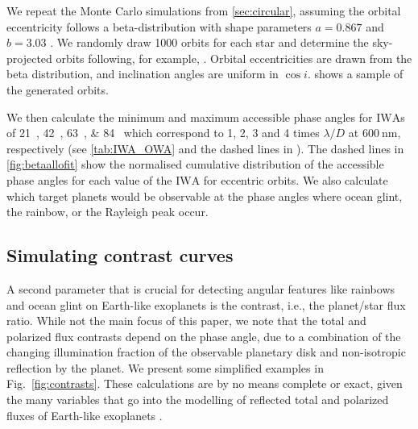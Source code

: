 \documentclass[usenatbib]{mnras}
\newcommand{\IWA}{\ensuremath{\mathrm{IWA}}\xspace}
\begin{document}
We repeat the Monte Carlo simulations from \cref{sec:circular}, assuming the orbital eccentricity follows a beta-distribution with shape parameters $a=0.867$ and $b=3.03$ \citep{2013MNRAS.434L..51K}. 
We randomly draw \num{1000} orbits for each star and determine the sky-projected orbits following, for example, \citet{2010exop.book...15M}. 
Orbital eccentricities are drawn from the beta distribution, and inclination angles are uniform in $\cos i$. 
 shows a sample of the generated orbits.

We then calculate the minimum and maximum accessible phase angles for \IWA{}s of \qtylist{21; 42; 63; 84}{\mas} which correspond to 1, 2, 3 and 4 times $\lambda / D$ at $\qty{600}{\nano\meter}$, respectively (see \cref{tab:IWA_OWA} and the dashed lines in ).
The dashed lines in \cref{fig:betaallofit} show the normalised cumulative distribution of the accessible phase angles for each value of the \IWA for eccentric orbits. 
We also calculate which target planets would be observable at the phase angles where ocean glint, the rainbow, or the Rayleigh peak occur.



\subsection{Simulating contrast curves}
\label{subsec:2.4}

A second parameter that is crucial for detecting angular features like rainbows and ocean glint on Earth-like exoplanets is the contrast, i.e., the planet/star flux ratio. %
While not the main focus of this paper, we note that the total and polarized flux contrasts depend on the phase angle, due to a combination of the changing illumination fraction of the observable planetary disk and non-isotropic reflection by the planet.
We present some simplified examples in Fig.~\ref{fig:contrasts}. %
These calculations are by no means complete or exact, given the many variables that go into the modelling of reflected total and polarized fluxes of Earth-like exoplanets \citep{treesandstam2019,trees2022}.
\end{document}

